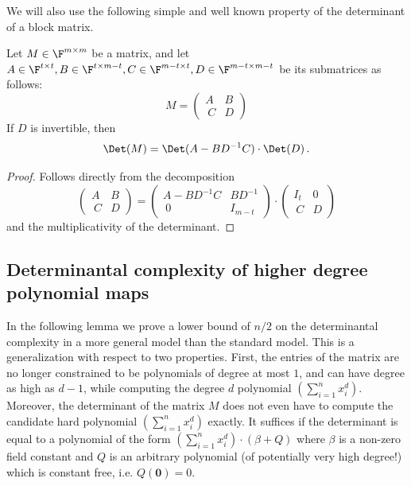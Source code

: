 We will also use the following simple and well known property of the determinant of a block matrix.

\begin{lemma}\label{lem:reducing size}
Let $M \in \F^{m \times m}$ be a matrix, and let $A \in \F^{t\times t}, B \in \F^{t\times m-t}, C \in \F^{m-t\times t}, D \in \F^{m-t\times m-t}$ be its submatrices as follows:
\[ M = \begin{pmatrix}
   A & B\\\
C & D
 \end{pmatrix}
 \]
 If $D$ is invertible, then 
 \[
 \Det (M)  = \Det (A - BD^{-1}C ) \cdot \Det (D) \, .
 \]
\end{lemma}

\begin{proof}
Follows directly from the decomposition
\[ \begin{pmatrix}
   A & B\\\
C & D
 \end{pmatrix}
 =
 \begin{pmatrix}
   A - BD^{-1}C & BD^{-1}\\\
0 & I_{m-t}
 \end{pmatrix}
 \cdot 
  \begin{pmatrix}
   I_t & 0\\\
C & D
 \end{pmatrix}
 \]
 and the multiplicativity of the determinant.
\end{proof}


\subsection{Determinantal complexity of higher degree polynomial maps}\label{sec:lb for higher deg maps}

In the following lemma we prove a lower bound of $n/2$ on the determinantal complexity in a more general model than the standard model. This is a generalization with respect to two properties. First, the entries of the matrix are no longer constrained to be polynomials of degree at most $1$, and can have degree as high as $d-1$, while computing the degree $d$ polynomial $\left(\sum_{i = 1}^n x_i^d\right)$. Moreover, the determinant of the matrix $M$ does not even have to compute the candidate hard polynomial $\left(\sum_{i = 1}^n x_i^d\right)$ exactly. It suffices if the determinant is equal to a polynomial of the form $\left(\sum_{i = 1}^n x_i^d\right) \cdot (\beta + Q)$ where $\beta$ is a non-zero field constant and $Q$ is an arbitrary polynomial (of potentially very high degree!) which is constant free, i.e. $Q(\mathbf{0}) = 0$.  

